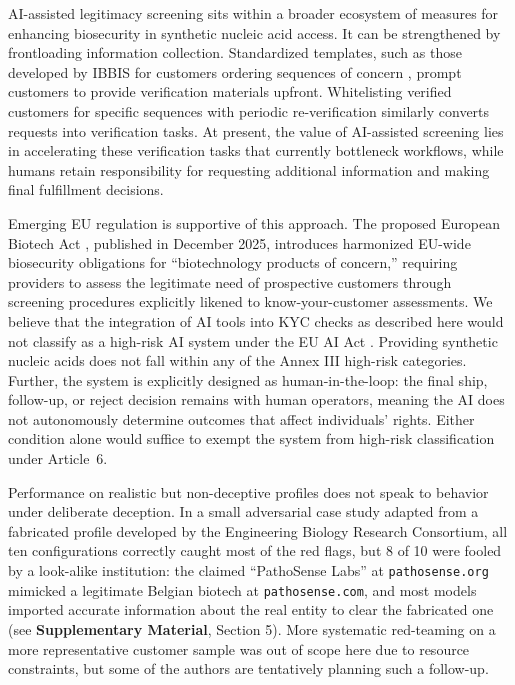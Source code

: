 \documentclass[12pt]{article}
\begin{document}
AI-assisted legitimacy screening sits within a broader ecosystem of measures for enhancing biosecurity in synthetic nucleic acid access. It can be strengthened by frontloading information collection. Standardized templates, such as those developed by IBBIS for customers ordering sequences of concern \citep{IBBIS2025}, prompt customers to provide verification materials upfront. Whitelisting verified customers for specific sequences with periodic re-verification \citep{Crawford2024} similarly converts requests into verification tasks. At present, the value of AI-assisted screening lies in accelerating these verification tasks that currently bottleneck workflows, while humans retain responsibility for requesting additional information and making final fulfillment decisions.

Emerging EU regulation is supportive of this approach. The proposed European Biotech Act \citep{EUBiotechAct2025}, published in December 2025, introduces harmonized EU-wide biosecurity obligations for ``biotechnology products of concern,'' requiring providers to assess the legitimate need of prospective customers through screening procedures explicitly likened to know-your-customer assessments. We believe that the integration of AI tools into KYC checks as described here would not classify as a high-risk AI system under the EU AI Act \citep{EUAIAct2024}. Providing synthetic nucleic acids does not fall within any of the Annex III high-risk categories. Further, the system is explicitly designed as human-in-the-loop: the final ship, follow-up, or reject decision remains with human operators, meaning the AI does not autonomously determine outcomes that affect individuals' rights. Either condition alone would suffice to exempt the system from high-risk classification under Article~6.

Performance on realistic but non-deceptive profiles does not speak to behavior under deliberate deception. In a small adversarial case study adapted from a fabricated profile developed by the Engineering Biology Research Consortium, all ten configurations correctly caught most of the red flags, but 8 of 10 were fooled by a look-alike institution: the claimed ``PathoSense Labs'' at \texttt{pathosense.org} mimicked a legitimate Belgian biotech at \texttt{pathosense.com}, and most models imported accurate information about the real entity to clear the fabricated one (see \textbf{Supplementary Material}, Section 5). More systematic red-teaming on a more representative customer sample was out of scope here due to resource constraints, but some of the authors are tentatively planning such a follow-up.
\end{document}
